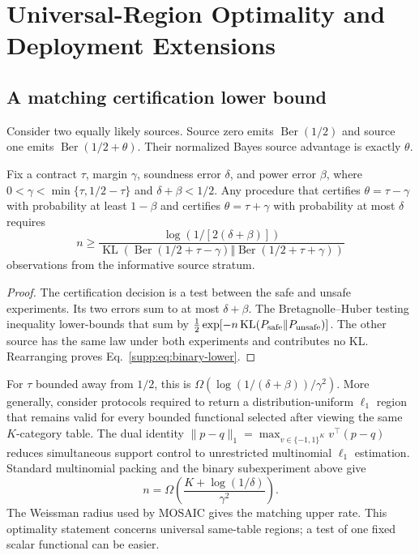 \section{Universal-Region Optimality and Deployment Extensions}

\subsection{A matching certification lower bound}

Consider two equally likely sources. Source zero emits
$\operatorname{Ber}(1/2)$ and source one emits
$\operatorname{Ber}(1/2+\theta)$. Their normalized Bayes source advantage is
exactly $\theta$.

\begin{theorem}
Fix a contract $\tau$, margin $\gamma$, soundness error $\delta$, and power
error $\beta$, where
$0<\gamma<\min\{\tau,1/2-\tau\}$ and $\delta+\beta<1/2$.
Any procedure that certifies $\theta=\tau-\gamma$ with probability at least
$1-\beta$ and certifies $\theta=\tau+\gamma$ with probability at most
$\delta$ requires
\begin{equation}
n\geq
\frac{\log(1/[2(\delta+\beta)])}
{\operatorname{KL}(\operatorname{Ber}(1/2+\tau-\gamma)
\Vert\operatorname{Ber}(1/2+\tau+\gamma))}
\label{supp:eq:binary-lower}
\end{equation}
observations from the informative source stratum.
\end{theorem}

\begin{proof}
The certification decision is a test between the safe and unsafe
experiments. Its two errors sum to at most $\delta+\beta$. The
Bretagnolle--Huber testing inequality lower-bounds that sum by
$\frac12\exp[-n\operatorname{KL}(P_{\rm safe}\Vert P_{\rm unsafe})]$.
The other source has the same law under both experiments and contributes no
KL. Rearranging proves Eq.~\eqref{supp:eq:binary-lower}.
\end{proof}

For $\tau$ bounded away from $1/2$, this is
$\Omega(\log(1/(\delta+\beta))/\gamma^2)$. More generally, consider protocols
required to return a distribution-uniform $\ell_1$ region that remains valid
for every bounded functional selected after viewing the same $K$-category
table. The dual identity
$\|p-q\|_1=\max_{v\in\{-1,1\}^K}v^\top(p-q)$ reduces simultaneous support
control to unrestricted multinomial $\ell_1$ estimation. Standard multinomial
packing and the binary subexperiment above give
\begin{equation}
n=\Omega\!\left(
\frac{K+\log(1/\delta)}{\gamma^2}\right).
\end{equation}
The Weissman radius used by MOSAIC gives the matching upper rate. This
optimality statement concerns universal same-table regions; a test of one
fixed scalar functional can be easier.

